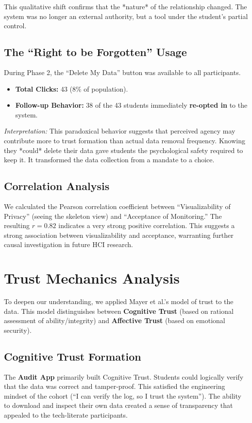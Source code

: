 \documentclass[conference]{IEEEtran}
\begin{document}
This qualitative shift confirms that the *nature* of the relationship changed. The system was no longer an external authority, but a tool under the student's partial control.

\subsection{The ``Right to be Forgotten'' Usage}
During Phase 2, the ``Delete My Data'' button was available to all participants.
\begin{itemize}
    \item \textbf{Total Clicks:} 43 (8\% of population).
    \item \textbf{Follow-up Behavior:} 38 of the 43 students immediately \textbf{re-opted in} to the system.
\end{itemize}
\textit{Interpretation:} This paradoxical behavior suggests that perceived agency may contribute more to trust formation than actual data removal frequency. Knowing they *could* delete their data gave students the psychological safety required to keep it. It transformed the data collection from a mandate to a choice.

\subsection{Correlation Analysis}
We calculated the Pearson correlation coefficient between ``Visualizability of Privacy'' (seeing the skeleton view) and ``Acceptance of Monitoring.'' The resulting $r=0.82$ indicates a very strong positive correlation. This suggests a strong association between visualizability and acceptance, warranting further causal investigation in future HCI research.

\section{Trust Mechanics Analysis}

To deepen our understanding, we applied Mayer et al.'s model of trust to the data. This model distinguishes between \textbf{Cognitive Trust} (based on rational assessment of ability/integrity) and \textbf{Affective Trust} (based on emotional security).

\subsection{Cognitive Trust Formation}
The \textbf{Audit App} primarily built Cognitive Trust. Students could logically verify that the data was correct and tamper-proof. This satisfied the engineering mindset of the cohort (``I can verify the log, so I trust the system''). The ability to download and inspect their own data created a sense of transparency that appealed to the tech-literate participants.
\end{document}
